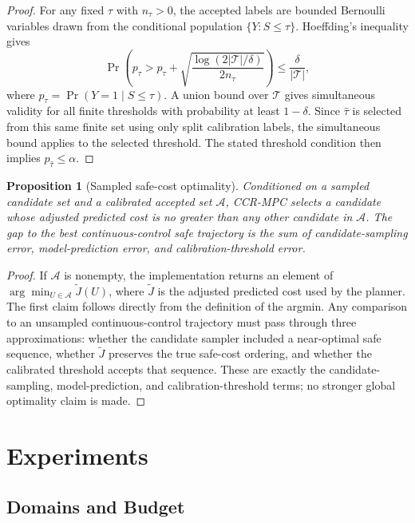 \documentclass[11pt]{article}
\newtheorem{proposition}{Proposition}
\begin{document}
\begin{proof}
For any fixed $\tau$ with $n_\tau>0$, the accepted labels are bounded Bernoulli variables drawn from the conditional population $\{Y:S\leq\tau\}$. Hoeffding's inequality gives
\[
  \Pr\left(p_\tau >
  \widehat p_\tau +
  \sqrt{\frac{\log(2|\mathcal{T}|/\delta)}{2n_\tau}}\right)
  \leq \frac{\delta}{|\mathcal{T}|},
\]
where $p_\tau=\Pr(Y=1\mid S\leq\tau)$. A union bound over $\mathcal{T}$ gives simultaneous validity for all finite thresholds with probability at least $1-\delta$. Since $\widehat\tau$ is selected from this same finite set using only split calibration labels, the simultaneous bound applies to the selected threshold. The stated threshold condition then implies $p_{\widehat\tau}\leq\alpha$.
\end{proof}

\begin{proposition}[Sampled safe-cost optimality]
Conditioned on a sampled candidate set and a calibrated accepted set $\mathcal{A}$, CCR-MPC selects a candidate whose adjusted predicted cost is no greater than any other candidate in $\mathcal{A}$. The gap to the best continuous-control safe trajectory is the sum of candidate-sampling error, model-prediction error, and calibration-threshold error.
\end{proposition}

\begin{proof}
If $\mathcal{A}$ is nonempty, the implementation returns an element of $\arg\min_{U\in\mathcal{A}}\widetilde J(U)$, where $\widetilde J$ is the adjusted predicted cost used by the planner. The first claim follows directly from the definition of the argmin. Any comparison to an unsampled continuous-control trajectory must pass through three approximations: whether the candidate sampler included a near-optimal safe sequence, whether $\widetilde J$ preserves the true safe-cost ordering, and whether the calibrated threshold accepts that sequence. These are exactly the candidate-sampling, model-prediction, and calibration-threshold terms; no stronger global optimality claim is made.
\end{proof}

\section{Experiments}

\subsection{Domains and Budget}
\end{document}
